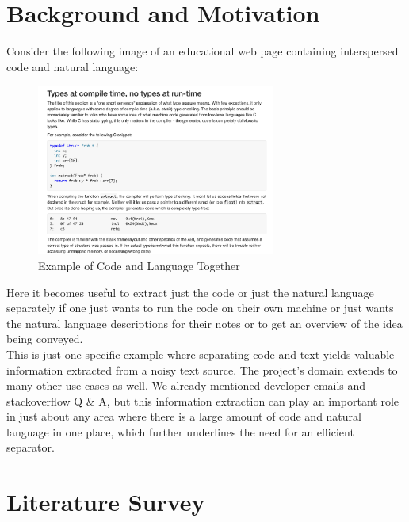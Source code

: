 \documentclass[12pt]{scrreprt}
\begin{document}
\chapter{Background and Motivation}


Consider the following image of an educational web page containing interspersed code and natural language:

\begin{figure}[h]
    \centering
    \includegraphics[width=0.7\textwidth]{figures/background-eg.png}
    \caption{Example of Code and Language Together}
    \label{fig:code-lang}
\end{figure}

Here it becomes useful to extract just the code or just the natural language separately if one just wants to run the code on their own machine or just wants the natural language descriptions for their notes or to get an overview of the idea being conveyed. \\ This is just one specific example where separating code and text yields valuable information extracted from a noisy text source. The project's domain extends to many other use cases as well. We already mentioned developer emails and stackoverflow Q \& A, but this information extraction can play an important role in just about any area where there is a large amount of code and natural language in one place, which further underlines the need for an efficient separator.


\chapter{Literature Survey}


\end{document}
